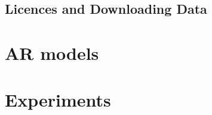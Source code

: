 \subsection{Licences and Downloading Data} \label{sec:downloading_data}

\section{AR models}

\section{Experiments}







